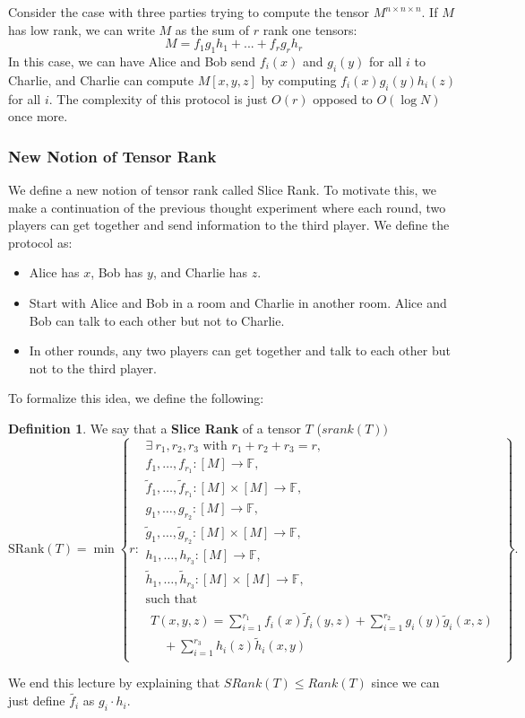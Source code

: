 \documentclass[11pt]{article}
\theoremstyle{definition}
\newtheorem{definition}{Definition}[section]
\begin{document}
Consider the case with three parties trying to compute the tensor $M^{n \times n \times n}$. If $M$ has low rank, we can write $M$ as the sum of $r$ rank one tensors:
$$M = f_1 g_1 h_1 + ... + f_r g_r h_r$$
In this case, we can have Alice and Bob send $f_i(x)$ and $g_i(y)$ for all $i$ to Charlie, and Charlie can compute $M[x,y,z]$ by computing $f_i(x) g_i(y) h_i(z)$ for all $i$. The complexity of this protocol is just $O(r)$ opposed to $O(\log N)$ once more.
\subsubsection{New Notion of Tensor Rank}
We define a new notion of tensor rank called Slice Rank. To motivate this, we make a continuation of the previous thought experiment where each round, two players can get together and send information to the third player. We define the protocol as:
\begin{itemize}
    \item Alice has $x$, Bob has $y$, and Charlie has $z$.
    \item Start with Alice and Bob in a room and Charlie in another room. Alice and Bob can talk to each other but not to Charlie.
    \item In other rounds, any two players can get together and talk to each other but not to the third player.
\end{itemize}
To formalize this idea, we define the following:
\begin{definition}
    We say that a \textbf{Slice Rank} of a tensor $T$ ($srank(T))$\\

    \[
    \mathrm{SRank}(T)
    =
    \min \left\{ r :
    \begin{array}{l}
    \exists\ r_1,r_2,r_3 \text{ with } r_1+r_2+r_3=r, \\[4pt]
    f_1,\dots,f_{r_1} : [M]\to\mathbb{F}, \\
    \widetilde f_1,\dots,\widetilde f_{r_1} : [M]\times[M]\to\mathbb{F}, \\[4pt]
    g_1,\dots,g_{r_2} : [M]\to\mathbb{F}, \\
    \widetilde g_1,\dots,\widetilde g_{r_2} : [M]\times[M]\to\mathbb{F}, \\[4pt]
    h_1,\dots,h_{r_3} : [M]\to\mathbb{F}, \\
    \widetilde h_1,\dots,\widetilde h_{r_3} : [M]\times[M]\to\mathbb{F}, \\[6pt]
    \text{such that } \\
    \begin{aligned}
    T(x,y,z) = \sum_{i=1}^{r_1} f_i(x)\widetilde f_i(y,z) + \sum_{i=1}^{r_2} g_i(y)\widetilde g_i(x,z) \\
    \quad + \sum_{i=1}^{r_3} h_i(z)\widetilde h_i(x,y)
    \end{aligned}
    \end{array}
    \right\}.
    \]
\end{definition}
We end this lecture by explaining that $SRank(T) \leq Rank(T)$ since we can just define $\widetilde{f_i}$ as $g_i \cdot h_i$.
\end{document}
